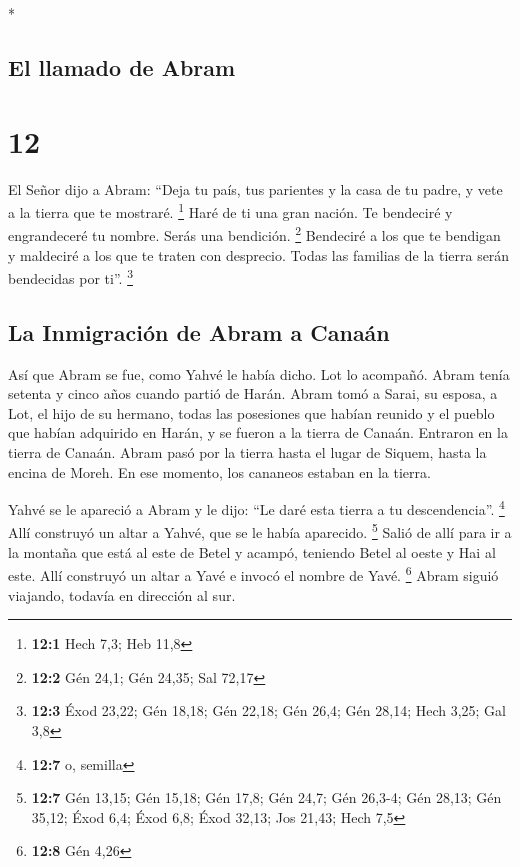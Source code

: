 \begin{paracol}{2}
\begin{otherlanguage}{english}
\end{otherlanguage}

\switchcolumn[0]*

\hypertarget{el-llamado-de-abram}{%
\subsection{El llamado de Abram}\label{el-llamado-de-abram}}

\hypertarget{section-22}{%
\section{12}\label{section-22}}

 El Señor dijo a Abram: ``Deja tu país, tus parientes y la
casa de tu padre, y vete a la tierra que te mostraré. \footnote{\textbf{12:1}
  Hech 7,3; Heb 11,8}  Haré de ti una gran nación. Te
bendeciré y engrandeceré tu nombre. Serás una bendición. \footnote{\textbf{12:2}
  Gén 24,1; Gén 24,35; Sal 72,17}  Bendeciré a los que te
bendigan y maldeciré a los que te traten con desprecio. Todas las
familias de la tierra serán bendecidas por ti''. \footnote{\textbf{12:3}
  Éxod 23,22; Gén 18,18; Gén 22,18; Gén 26,4; Gén 28,14; Hech 3,25; Gal
  3,8}

\hypertarget{la-inmigraciuxf3n-de-abram-a-canauxe1n}{%
\subsection{La Inmigración de Abram a
Canaán}\label{la-inmigraciuxf3n-de-abram-a-canauxe1n}}

 Así que Abram se fue, como Yahvé le había dicho. Lot lo
acompañó. Abram tenía setenta y cinco años cuando partió de Harán.
 Abram tomó a Sarai, su esposa, a Lot, el hijo de su
hermano, todas las posesiones que habían reunido y el pueblo que habían
adquirido en Harán, y se fueron a la tierra de Canaán. Entraron en la
tierra de Canaán.  Abram pasó por la tierra hasta el lugar
de Siquem, hasta la encina de Moreh. En ese momento, los cananeos
estaban en la tierra.

 Yahvé se le apareció a Abram y le dijo: ``Le daré esta
tierra a tu descendencia''. \footnote{\textbf{12:7} o, semilla} Allí
construyó un altar a Yahvé, que se le había aparecido. \footnote{\textbf{12:7}
  Gén 13,15; Gén 15,18; Gén 17,8; Gén 24,7; Gén 26,3-4; Gén 28,13; Gén
  35,12; Éxod 6,4; Éxod 6,8; Éxod 32,13; Jos 21,43; Hech 7,5}
 Salió de allí para ir a la montaña que está al este de
Betel y acampó, teniendo Betel al oeste y Hai al este. Allí construyó un
altar a Yavé e invocó el nombre de Yavé. \footnote{\textbf{12:8} Gén
  4,26}  Abram siguió viajando, todavía en dirección al
sur.


\end{paracol}
